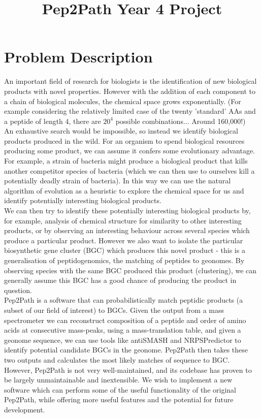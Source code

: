 \documentclass{article}
\title{Pep2Path Year 4 Project}
\begin{document}
\section*{Problem Description}

An important field of research for biologists is the identification of new biological products with novel properties.
However with the addition of each component to a chain of biological molecules, the chemical space grows exponentially.
(For example considering the relatively limited case of the twenty 'standard' AAs and a peptide of length 4, there are
\(20^4\) possible combinations... Around 160,000!) \\

An exhaustive search would be impossible, so instead we identify biological products produced in the wild.
For an organism to spend biological resources producing some product, we can assume it confers some evolutionary advantage.
For example, a strain of bacteria might produce a biological product that kills another competitor species of bacteria
(which we can then use to ourselves kill a potentially deadly strain of bacteria).
In this way we can use the natural algorithm of evolution as a heuristic to explore the chemical space for us and identify potentially
interesting biological products. \\

We can then try to identify these potentially interesting biological products by, for example, analysis of chemical structure
for similarity to other interesting products, or by observing an interesting behaviour across several species which
produce a particular product. However we also want to isolate the particular biosynthetic gene cluster (BGC) which produces
this novel product - this is a generalisation of peptidogenomics, the matching of peptides to geonomes. 
By observing species with the same BGC produced this product (clustering), we can generally assume this BGC has a good chance of 
producing the product in question. \\

Pep2Path is a software that can probabilistically match peptidic products (a subset of our field of interest) to BGCs. 
Given the output from a mass spectrometer we can reconstruct composition of a peptide and order of amino acids at consecutive mass-peaks, 
using a mass-translation table, and given a geonome sequence, we can use tools like antiSMASH and NRPSPredictor to 
identify potential candidate BGCs in the geonome. Pep2Path then takes these two outputs and calculates the most likely matches of
sequence to BGC. \\

However, Pep2Path is not very well-maintained, and its codebase has proven to be largely unmaintainable and inextensible.
We wish to implement a new software which can perform some of the useful functionality of the original Pep2Path,
while offering more useful features and the potential for future development. 
\end{document}
